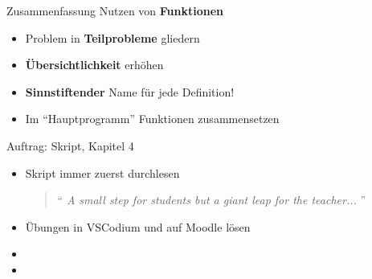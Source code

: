 \begin{frame}[fragile]{Zusammenfassung}
Nutzen von \textbf{Funktionen}
\begin{itemize}[<+->]
\item Problem in \textbf{Teilprobleme} gliedern
\item \textbf{Übersichtlichkeit} erhöhen
\item \textbf{Sinnstiftender} Name für jede Definition!
\item Im ``Hauptprogramm'' Funktionen zusammensetzen
\end{itemize}
\end{frame}

\begin{frame}[fragile]{Auftrag: Skript, Kapitel 4}
\begin{itemize}
\item Skript immer zuerst durchlesen 
\begin{quote}
\enquote{
\textit{A small step for students but a giant leap for the teacher...}
}
\end{quote}
\item Übungen in VSCodium und auf Moodle lösen
\item {}
\item {}
\end{itemize}


\end{frame}

